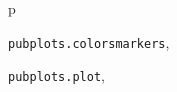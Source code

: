 \documentclass[letterpaper,10pt,english]{sphinxmanual}
\begin{document}
\renewcommand{\indexname}{Python Module Index}
\begin{theindex}
\def\bigletter#1{{\Large\sffamily#1}\nopagebreak\vspace{1mm}}
\bigletter{p}
\item {\texttt{pubplots.colorsmarkers}}, \pageref{pubplots:module-pubplots.colorsmarkers}
\item {\texttt{pubplots.plot}}, \pageref{pubplots:module-pubplots.plot}
\end{theindex}

\renewcommand{\indexname}{Index}
\printindex
\end{document}
